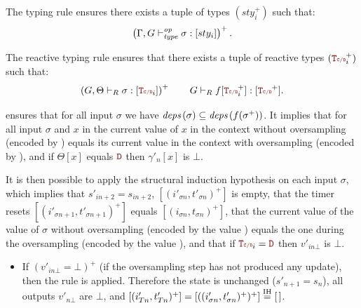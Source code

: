 \begin{skippableproof}
    The typing rule  ensures there exists a tuple
    of types $(sty_i^+)$ such that:
    \begin{align*}
        \left(\Gamma, G \vdash_{\textit{type}}^{\textit{op}} \sigma: [sty_i]\right)^+.
    \end{align*}

    The reactive typing rule  ensures that
    there exists a tuple of reactive types $(\rType_i^+)$ such that:
    \begin{equation*}
        \left(\opTypedReact{\Theta}{\sigma}{\rType_i}\right)^+ \qquad
        \compTypedReact{f}{\rType_i^+}{\rType^+}.
    \end{equation*}

     ensures that for all input $\sigma$ we
    have ${\textit{deps}\left(\sigma\right)} \subseteq {\ensuremath{\textit{deps}\left(f(\sigma^+)\right)}}$. It implies that for all input $\sigma$
    and $x$ in \depSet{\sigma} the current value of $x$ in the context without oversampling
    (encoded by ) equals its current value in the context with
    oversampling (encoded by ),
    and if $\Theta[x]$ equals $\dType$ then $\gamma'_n[x]$ is $\bot$.

    It is then possible to apply the structural induction hypothesis on each input $\sigma$, which
    implies that $s'_{in+2} = s_{in+2}$, $[(i'_{\sigma n}, t'_{\sigma n})^+]$ is empty, that the
    timer resets $[(i'_{\sigma n+1}, t'_{\sigma n+1})^+]$ equals $[(i_{\sigma n}, t_{\sigma n})^+]$,
    that the current value of the value of $\sigma$ without oversampling (encoded by the value ) equals the one during the oversampling (encoded by the value ), and that if $\rType_i = \dType$ then $v'_{in\bot}$
    is $\bot$.

    \begin{itemize}
        \item If $\left(v'_{in\bot} = \bot\right)^+$ (if the oversampling step has not produced any
              update), then the rule  is
              applied. Therefore the state is unchanged ($s'_{n+1} = s_n$), all outputs $v'_{n\bot}$
              are $\bot$, and $[(i'_{Tn}, t'_{Tn})^+] = [((i'_{\sigma n},t'_{\sigma n})^+)^+]
                  \overset{\mathrm{IH}}{=} [\,]$.


\end{itemize}
\end{skippableproof}
